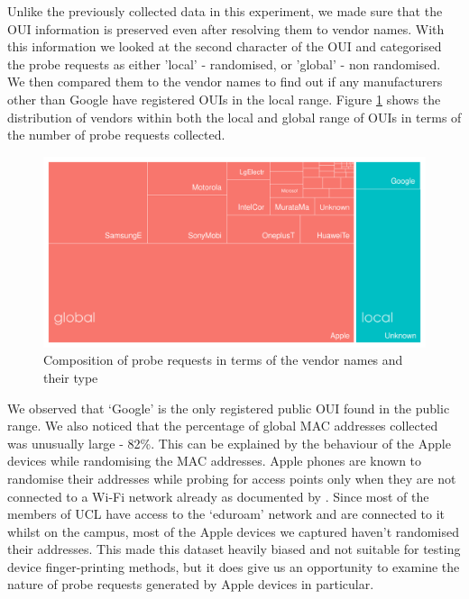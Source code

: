 Unlike the previously collected data in this experiment, we made sure that the OUI information is preserved even after resolving them to vendor names.
With this information we looked at the second character of the OUI and categorised the probe requests as either 'local' - randomised, or 'global' - non randomised.
We then compared them to the vendor names to find out if any manufacturers other than Google have registered OUIs in the local range.
Figure \ref{figure:collection:ucl:treemap} shows the distribution of vendors within both the local and global range of OUIs in terms of the number of probe requests collected.

\begin{figure}
  \includegraphics{images/ucl-local-treemap.png}
  \caption{Composition of probe requests in terms of the vendor names and their type}
  \label{figure:collection:ucl:treemap}
\end{figure}

We observed that `Google' is the only registered public OUI found in the public range. 
We also noticed that the percentage of global MAC addresses collected was unusually large - 82\%.
This can be explained by the behaviour of the Apple devices while randomising the MAC addresses. 
Apple phones are known to randomise their addresses while probing for access points only when they are not connected to a Wi-Fi network already as documented by \citet{vanhoef2016}.
Since most of the members of UCL have access to the `eduroam' network and are connected to it whilst on the campus, most of the Apple devices we captured haven't randomised their addresses.
This made this dataset heavily biased and not suitable for testing device finger-printing methods, but it does give us an opportunity to examine the nature of probe requests generated by Apple devices in particular.

